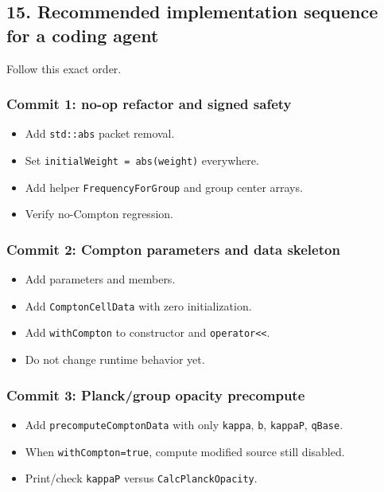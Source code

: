 \documentclass[
]{article}
\providecommand{\tightlist}{%
  \setlength{\itemsep}{0pt}\setlength{\parskip}{0pt}}
\begin{document}
\subsection{15. Recommended implementation sequence for a coding
agent}\label{recommended-implementation-sequence-for-a-coding-agent}

Follow this exact order.

\subsubsection{Commit 1: no-op refactor and signed
safety}\label{commit-1-no-op-refactor-and-signed-safety}

\begin{itemize}
\tightlist
\item
  Add \texttt{std::abs} packet removal.
\item
  Set \texttt{initialWeight\ =\ abs(weight)} everywhere.
\item
  Add helper \texttt{FrequencyForGroup} and group center arrays.
\item
  Verify no-Compton regression.
\end{itemize}

\subsubsection{Commit 2: Compton parameters and data
skeleton}\label{commit-2-compton-parameters-and-data-skeleton}

\begin{itemize}
\tightlist
\item
  Add parameters and members.
\item
  Add \texttt{ComptonCellData} with zero initialization.
\item
  Add \texttt{withCompton} to constructor and
  \texttt{operator\textless{}\textless{}}.
\item
  Do not change runtime behavior yet.
\end{itemize}

\subsubsection{Commit 3: Planck/group opacity
precompute}\label{commit-3-planckgroup-opacity-precompute}

\begin{itemize}
\tightlist
\item
  Add \texttt{precomputeComptonData} with only \texttt{kappa},
  \texttt{b}, \texttt{kappaP}, \texttt{qBase}.
\item
  When \texttt{withCompton=true}, compute modified source still
  disabled.
\item
  Print/check \texttt{kappaP} versus \texttt{CalcPlanckOpacity}.
\end{itemize}
\end{document}
